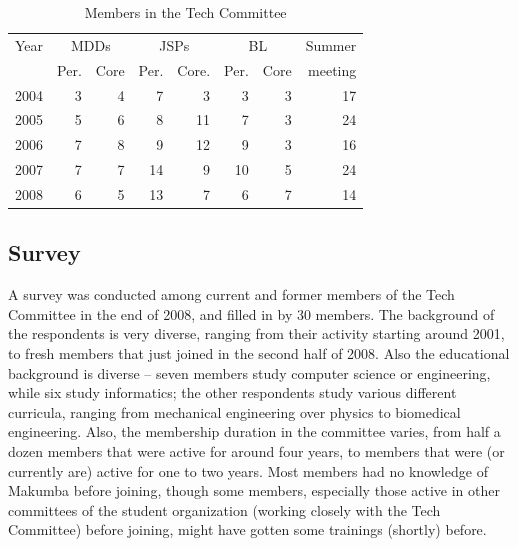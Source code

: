 \documentclass{acm_proc_article-sp}
\begin{document}
\begin{table}\label{tab:itd-members}
	\centering
	\caption{Members in the Tech Committee}
	\begin{tabular}{c|r|r|r|r|r|r|r|}
		\hline
		\hline
		Year 		& \multicolumn{2}{c|}{MDDs} & \multicolumn{2}{c|}{JSPs}	& \multicolumn{2}{c|}{BL}	& Summer	\\
					& Per.& Core				& Per.& Core.				& Per.& Core				& meeting	\\
		\hline
		\hline
		2004 & 3 & 4 & 7 & 3 & 3 & 3 & 17 \\
		\hline
		2005 & 5 & 6 & 8 & 11 & 7 & 3 & 24 \\
		\hline
		2006 & 7 & 8 & 9 & 12 & 9 & 3 & 16 \\
		\hline
		2007 & 7 & 7 & 14 & 9 & 10 & 5 & 24 \\
		\hline
		2008 & 6 & 5 & 13 & 7 & 6 & 7 & 14 \\
		\hline
		\hline
	\end{tabular}
\end{table} 

\subsection{Survey}\label{sec:techCommittee-survey}
A survey was conducted among current and former members of the Tech Committee in the end of 2008, and filled in by 30 members. The background of the respondents is very diverse, ranging from their activity starting around 2001, to fresh members that just joined in the second half of 2008. Also the educational background is diverse -- seven members study computer science or engineering, while six study informatics; the other respondents study various different curricula, ranging from mechanical engineering over physics to biomedical engineering. Also, the membership duration in the committee varies, from half a dozen members that were active for around four years, to members that were (or currently are) active for one to two years. Most members had no knowledge of Makumba before joining, though some members, especially those active in other committees of the student organization (working closely with the Tech Committee) before joining, might have gotten some trainings (shortly) before.
\end{document}
